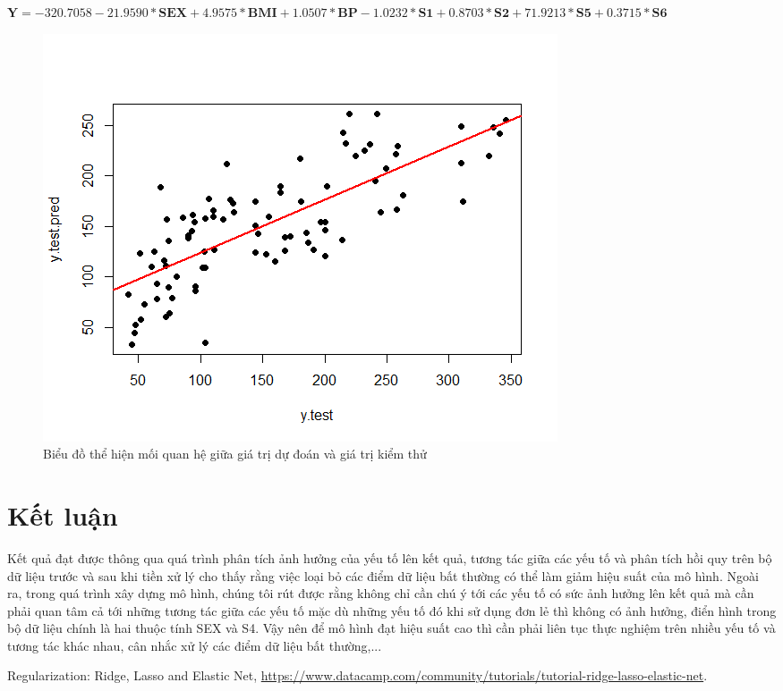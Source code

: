 \documentclass[runningheads]{llncs}
\begin{document}
\begin{center}
	$\textbf{Y}=  -320.7058 -21.9590* \textbf{SEX} + 4.9575*\textbf{BMI} +  1.0507*\textbf{BP} -
	1.0232*\textbf{S1} + 0.8703*\textbf{S2} + 71.9213*\textbf{S5} + 0.3715*\textbf{S6} $
\end{center}

\begin{figure}[H]
\centering
\includegraphics[width=\textwidth]{Rplot}
\caption{Biểu đồ thể hiện mối quan hệ giữa giá trị dự đoán và giá trị kiểm thử} \label{fig2}
\end{figure}

\section{Kết luận}
 Kết quả đạt được thông qua quá trình phân tích ảnh hưởng của yếu tố lên kết quả, tương tác giữa các yếu tố và phân tích hồi quy trên bộ dữ liệu trước và sau khi tiền xử lý cho thấy rằng việc loại bỏ các điểm dữ liệu bất thường có thể làm giảm hiệu suất của mô hình. Ngoài ra, trong quá trình xây dựng mô hình, chúng tôi rút được rằng  không chỉ cần chú ý tới các yếu tố có sức ảnh hưởng lên kết quả mà cần phải quan tâm cả tới những tương tác giữa các yếu tố mặc dù những yếu tố đó khi sử dụng đơn lẻ thì không có ảnh hưởng, điển hình trong bộ dữ liệu chính là hai thuộc tính SEX và S4. Vậy nên để mô hình đạt hiệu suất cao thì cần phải liên tục thực nghiệm trên nhiều yếu tố và tương tác khác nhau, cân nhắc xử lý các điểm dữ liệu bất thường,...

\begin{thebibliography}{5}
Regularization: Ridge, Lasso and Elastic Net, \url{https://www.datacamp.com/community/tutorials/tutorial-ridge-lasso-elastic-net}.
\end{thebibliography}
\end{document}
